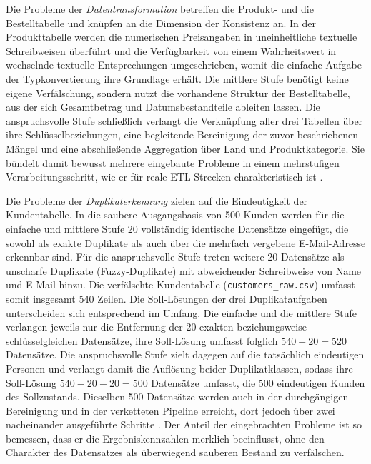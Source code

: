Die Probleme der \emph{Datentransformation} betreffen die Produkt- und die Bestelltabelle und knüpfen an die Dimension der Konsistenz an. In der Produkttabelle werden die numerischen Preisangaben in uneinheitliche textuelle Schreibweisen überführt und die Verfügbarkeit von einem Wahrheitswert in wechselnde textuelle Entsprechungen umgeschrieben, womit die einfache Aufgabe der Typkonvertierung ihre Grundlage erhält. Die mittlere Stufe benötigt keine eigene Verfälschung, sondern nutzt die vorhandene Struktur der Bestelltabelle, aus der sich Gesamtbetrag und Datumsbestandteile ableiten lassen. Die anspruchsvolle Stufe schließlich verlangt die Verknüpfung aller drei Tabellen über ihre Schlüsselbeziehungen, eine begleitende Bereinigung der zuvor beschriebenen Mängel und eine abschließende Aggregation über Land und Produktkategorie. Sie bündelt damit bewusst mehrere eingebaute Probleme in einem mehrstufigen Verarbeitungsschritt, wie er für reale \ac{ETL}-Strecken charakteristisch ist \autocite{khanOverviewETLTechniques2024,walhaDataIntegrationTraditional2024}.

Die Probleme der \emph{Duplikaterkennung} zielen auf die Eindeutigkeit der Kundentabelle. In die saubere Ausgangsbasis von 500 Kunden werden für die einfache und mittlere Stufe 20 vollständig identische Datensätze eingefügt, die sowohl als exakte Duplikate als auch über die mehrfach vergebene E-Mail-Adresse erkennbar sind. Für die anspruchsvolle Stufe treten weitere 20 Datensätze als unscharfe Duplikate (Fuzzy-Duplikate) mit abweichender Schreibweise von Name und E-Mail hinzu. Die verfälschte Kundentabelle (\texttt{customers\_raw.csv}) umfasst somit insgesamt 540 Zeilen. Die Soll-Lösungen der drei Duplikataufgaben unterscheiden sich entsprechend im Umfang. Die einfache und die mittlere Stufe verlangen jeweils nur die Entfernung der 20 exakten beziehungsweise schlüsselgleichen Datensätze, ihre Soll-Lösung umfasst folglich $540 - 20 = 520$ Datensätze. Die anspruchsvolle Stufe zielt dagegen auf die tatsächlich eindeutigen Personen und verlangt damit die Auflösung beider Duplikatklassen, sodass ihre Soll-Lösung $540 - 20 - 20 = 500$ Datensätze umfasst, die 500 eindeutigen Kunden des Sollzustands. Dieselben 500 Datensätze werden auch in der durchgängigen Bereinigung und in der verketteten Pipeline erreicht, dort jedoch über zwei nacheinander ausgeführte Schritte \autocite{coteDataCleaningMachine2024,hassaniRoleChatGPTData2023}. Der Anteil der eingebrachten Probleme ist so bemessen, dass er die Ergebniskennzahlen merklich beeinflusst, ohne den Charakter des Datensatzes als überwiegend sauberen Bestand zu verfälschen.


